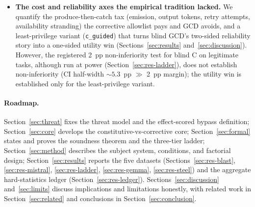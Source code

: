 \begin{itemize}[leftmargin=1.4em]
  \item \textbf{The cost and reliability axes the empirical tradition lacked.} We quantify the produce-then-catch tax (emission, output tokens, retry attempts, availability stranding) the corrective allowlist pays and GCD avoids, and a least-privilege variant (\texttt{c\_guided}) that turns blind GCD's two-sided reliability story into a one-sided utility win (Sections~\ref{sec:results} and~\ref{sec:discussion}). However, the registered 2~pp non-inferiority test for blind C on legitimate tasks, although run at power (Section~\ref{sec:res-ladder}), does not establish non-inferiority (CI half-width \({\sim}5.3\)~pp \(\gg\) 2~pp margin); the utility win is established only for the least-privilege variant.
\end{itemize}

\paragraph{Roadmap.} Section~\ref{sec:threat} fixes the threat model and the effect-scored bypass definition; Section~\ref{sec:core} develops the constitutive-vs-corrective core; Section~\ref{sec:formal} states and proves the soundness theorem and the three-tier ladder; Section~\ref{sec:method} describes the subject system, conditions, and factorial design; Section~\ref{sec:results} reports the five datasets (Sections~\ref{sec:res-blast}, \ref{sec:res-mistral}, \ref{sec:res-ladder}, \ref{sec:res-gemma}, \ref{sec:res-steel}) and the aggregate hard-statistics ledger (Section~\ref{sec:res-ledger}). Sections~\ref{sec:discussion} and~\ref{sec:limits} discuss implications and limitations honestly, with related work in Section~\ref{sec:related} and conclusions in Section~\ref{sec:conclusion}.
